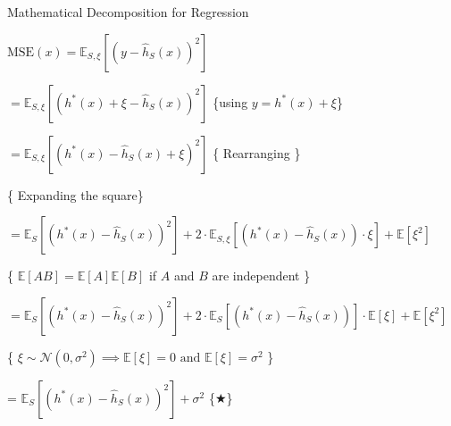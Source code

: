\documentclass{beamer}
\begin{document}
\begin{frame}{Mathematical Decomposition for Regression}
    \scriptsize{
        $\text{MSE}(x) = \mathbb{E}_{S, \xi} \left[ (y - \hat{h}_S(x))^2 \right]$ \hfill 
    
        \hspace{1cm} $= \mathbb{E}_{S, \xi} \left[ (h^*(x) + \xi - \hat{h}_S(x))^2 \right]$ \hfill \{using $y = h^*(x) + \xi$\} \hspace{0.2cm}
    
        \hspace{1cm} $= \mathbb{E}_{S, \xi} \left[ (h^*(x) - \hat{h}_S(x) + \xi)^2 \right]$ \hfill \{ Rearranging \} \hspace{0.2cm}
    
        \begin{center}
            \{ Expanding the square\} 
        \end{center}  
    
        \hspace{1cm} $= \mathbb{E}_S \left[ (h^*(x) - \hat{h}_S(x))^2 \right] + 2 \cdot \mathbb{E}_{S, \xi} \left[ (h^*(x) - \hat{h}_S(x))  \cdot \xi \right] + \mathbb{E}[\xi^2]$ 
    
        \begin{center}
            \{ $\mathbb{E}[AB] = \mathbb{E}[A]\mathbb{E}[B]$ if $A$ and $B$ are independent \}
        \end{center} 
        
        \hspace{1cm} $= \mathbb{E}_S \left[ (h^*(x) - \hat{h}_S(x))^2 \right] + 2 \cdot \mathbb{E}_S \left[ (h^*(x) - \hat{h}_S(x)) \right] \cdot \mathbb{E}[\xi] + \mathbb{E}[\xi^2]$ 
    
        \begin{center}
            \{ $\xi \sim \mathcal{N}(0, \sigma^2) \implies \mathbb{E}[\xi] = 0 \text{ and } \mathbb{E}[\xi] = \sigma^2$ \}
        \end{center} 
        
        \hspace{1cm} = $\mathbb{E}_S \left[ (h^*(x) - \hat{h}_S(x))^2 \right]  + \sigma^2$ \hfill \{$\bigstar$\} \hspace{0.2cm}
    }
    
\end{frame}
\end{document}
